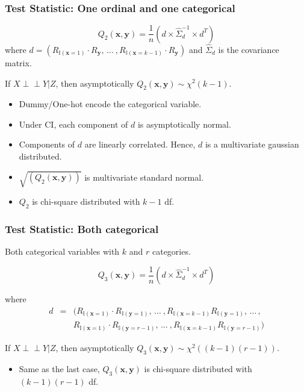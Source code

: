 \documentclass{beamer}
\def\ci{\perp\!\!\!\!\!\perp}
\begin{document}
\begin{frame}
	\frametitle{Test Statistic: One ordinal and one categorical}
	$$ Q_2(\bm{x}, \bm{y}) = \frac{1}{n} (d \times \hat{\Sigma}_d^{-1} \times d^T) $$
	where $ d = (R_{\mathbb{I}(\mathbf{x}=1)} \cdot R_{\mathbf{y}}, \, \ldots \ ,
		R_{\mathbb{I}(\mathbf{x}=k-1)} \cdot R_{\mathbf{y}})$ and $ \hat{\Sigma}_d $ is the covariance matrix.

	\vspace{1em}
	If $ X \ci Y | Z $, then asymptotically $ Q_2(\bm{x}, \bm{y}) \sim \chi^2(k-1) $.

	\begin{itemize}
		\setlength\itemsep{1em}
		\item Dummy/One-hot encode the categorical variable.
		\item Under CI, each component of $ d $ is asymptotically normal.
		\item Components of $ d $ are linearly correlated. Hence, $ d $ is 
			a multivariate gaussian distributed.
		\item $ \sqrt{(Q_2(\bm{x}, \bm{y}))} $ is multivariate standard normal.
		\item $ Q_2 $ is chi-square distributed with $ k-1 $ df.
	\end{itemize}
\end{frame}

\begin{frame}
	\frametitle{Test Statistic: Both categorical}
	Both categorical variables with $ k $ and $ r $ categories.


	$$ Q_3(\bm{x}, \bm{y}) = \frac{1}{n} (d \times \hat{\Sigma}_d^{-1} \times d^T) $$

	where 
	\begin{eqnarray*}
		d &  =  & (R_{\mathbb{I}(\mathbf{x}=1)} \cdot R_{\mathbb{I}(\mathbf{y}=1)}, \, \ldots \ ,
		R_{\mathbb{I}(\mathbf{x}=k-1)} R_{\mathbb{I}(\mathbf{y}=1)}, \, \ldots \, ,
		\\
	 	& & R_{\mathbb{I}(\mathbf{x}=1)} \cdot R_{\mathbb{I}(\mathbf{y}=r-1)}, \, \ldots \ ,
		R_{\mathbb{I}(\mathbf{x}=k-1)} R_{\mathbb{I}(\mathbf{y}=r-1)}
		)
	\end{eqnarray*}
	\vspace{1em}

	If $ X \ci Y | Z $, then asymptotically $ Q_3(\bm{x}, \bm{y}) \sim \chi^2((k-1)(r-1)) $.

	\begin{itemize}
		\setlength\itemsep{1em}
		\item Same as the last case, $ Q_3(\bm{x}, \bm{y}) $ is chi-square distributed 
			with $ (k-1)(r-1) $ df.
	\end{itemize}
\end{frame}
\end{document}
